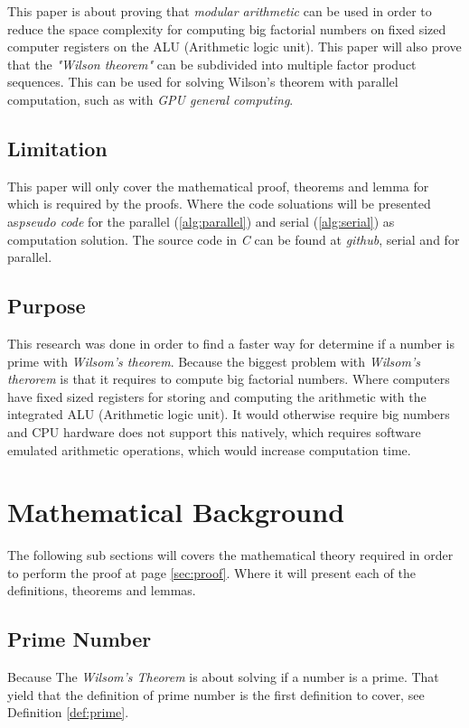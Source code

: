 \documentclass[12pt, oneside, onecolumn]{article}
\begin{document}
This paper is about proving that \emph{modular arithmetic} can be used in order to reduce the space complexity for computing big factorial numbers on fixed sized computer registers on the ALU (Arithmetic logic unit). This paper will also prove that the \emph{"Wilson theorem"} can be subdivided into multiple factor product sequences. This can be used for solving Wilson's theorem with parallel computation, such as with \emph{GPU general computing}.


\subsection{Limitation}
This paper will only cover the mathematical proof, theorems and lemma for which is required by the proofs. Where the code soluations will be presented as\emph{pseudo code} for the parallel (\ref{alg:parallel}) and serial (\ref{alg:serial}) as computation solution. The source code in \emph{C} can be found at \emph{github}, serial\cite{wprime} and for parallel\cite{clwprime}.


\subsection{Purpose}
This research was done in order to find a faster way for determine if a number is prime with \emph{Wilsom's theorem}. Because the biggest problem with \emph{Wilsom's therorem} is that it requires to compute big factorial numbers. Where computers have fixed sized registers for storing and computing the arithmetic with the integrated ALU (Arithmetic logic unit). It would otherwise require big numbers and CPU hardware does not support this natively, which requires software emulated arithmetic operations, which would increase computation time.

\section{Mathematical Background}
The following sub sections will covers the mathematical theory required in order to perform the proof at page \ref{sec:proof}. Where it will present each of the definitions, theorems and lemmas.

\subsection{Prime Number}
Because The \emph{Wilsom's Theorem} is about solving if a number is a prime. That yield that the definition of prime number is the first definition to cover, see Definition \ref{def:prime}.
\end{document}
